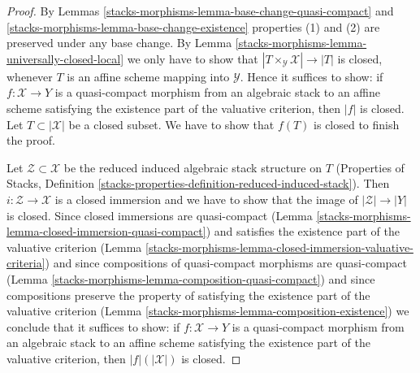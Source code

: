\begin{proof}
By Lemmas \ref{stacks-morphisms-lemma-base-change-quasi-compact}
and \ref{stacks-morphisms-lemma-base-change-existence}
properties (1) and (2) are preserved under
any base change. By Lemma \ref{stacks-morphisms-lemma-universally-closed-local}
we only have to show that $|T \times_\mathcal{Y} \mathcal{X}| \to |T|$
is closed, whenever $T$ is an affine scheme mapping into $\mathcal{Y}$.
Hence it suffices to show: if $f : \mathcal{X} \to Y$ is a
quasi-compact morphism from an algebraic stack to an affine scheme
satisfying the existence part of the valuative criterion,
then $|f|$ is closed. Let $T \subset |\mathcal{X}|$ be a closed subset.
We have to show that $f(T)$ is closed to finish the proof.

\medskip\noindent
Let $\mathcal{Z} \subset \mathcal{X}$ be the reduced induced
algebraic stack structure on $T$ (Properties of Stacks,
Definition \ref{stacks-properties-definition-reduced-induced-stack}).
Then $i : \mathcal{Z} \to \mathcal{X}$ is a closed immersion
and we have to show that the image of $|\mathcal{Z}| \to |Y|$
is closed. Since closed immersions are quasi-compact
(Lemma \ref{stacks-morphisms-lemma-closed-immersion-quasi-compact})
and satisfies the existence part of the valuative criterion
(Lemma \ref{stacks-morphisms-lemma-closed-immersion-valuative-criteria})
and since compositions of quasi-compact morphisms are quasi-compact
(Lemma \ref{stacks-morphisms-lemma-composition-quasi-compact})
and since compositions preserve the property of satisfying
the existence part of the valuative criterion
(Lemma \ref{stacks-morphisms-lemma-composition-existence})
we conclude that it suffices to show: if $f : \mathcal{X} \to Y$
is a quasi-compact morphism from an algebraic stack to an affine scheme
satisfying the existence part of the valuative criterion,
then $|f|(|\mathcal{X}|)$ is closed.


\end{proof}
